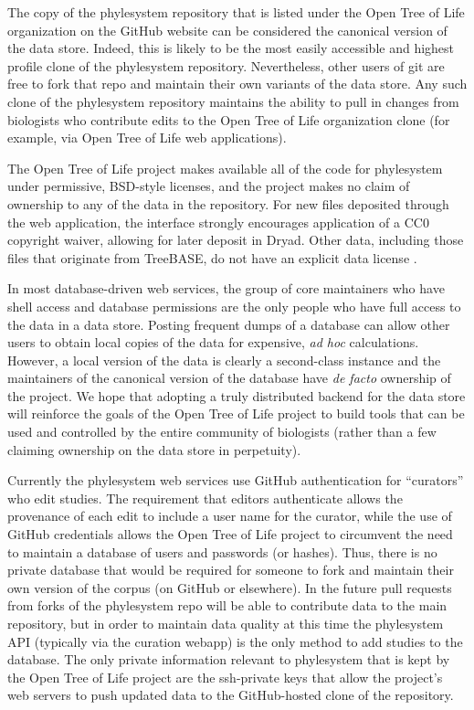 \documentclass{bioinfo}
\newcommand{\ps}{phylesystem\xspace}
\newcommand{\otol}{Open Tree of Life\xspace}
\begin{document}
The copy of the \ps repository that is listed under the \otol organization on
    the GitHub website %
    can be considered the canonical version of the data store.
Indeed, this is likely to be the most easily accessible and highest profile clone of the \ps repository.
Nevertheless, other users of git are free to fork that repo and maintain their own variants of the data store.
Any such clone of the \ps repository maintains the ability to pull in changes from biologists who contribute
    edits to the \otol organization clone (for example, via \otol web applications).

The \otol project makes available all of the code for \ps under permissive, BSD-style licenses, and the
    project makes no claim of ownership to any of the data in the repository. 
For new files deposited through the web application, the interface strongly encourages application of a CC0 copyright waiver, 
    allowing for later deposit in Dryad. Other data, including those files that originate from TreeBASE,
    do not have an explicit data license \citep[although we believe that copyright does not apply to any of the data; see][]{Patterson2014}.

In most database-driven web services, the group of core maintainers who have shell access and 
    database permissions are the only people who have full access to the data in a data store.
Posting frequent dumps of a database can allow other users to obtain local copies of the data 
    for expensive, {\em ad hoc} calculations.
However, a local version of the data is clearly a second-class instance and the maintainers of the 
    canonical version of the database have {\em de facto} ownership of the project.
We hope that adopting a truly distributed backend for the data store will reinforce the goals
    of the \otol project to build tools that can be used and controlled by the entire community of biologists 
    (rather than a few claiming ownership on the data store in perpetuity).

Currently the \ps web services use GitHub authentication for ``curators'' who edit studies.
The requirement that editors authenticate allows the provenance of each edit to include 
    a user name for the curator, while the use of GitHub credentials allows the \otol project
    to circumvent the need to maintain a database of users and passwords (or hashes).
Thus, there is no private database that would be required for someone to fork and maintain their
    own version of the corpus (on GitHub or elsewhere).
In the future pull requests from forks of the \ps repo will be able to contribute data to the main repository,
   but in order to maintain data quality at this time the \ps API (typically via the curation webapp) is the only method to add studies to the database.
The only private information relevant to \ps that is kept by the \otol project are the ssh-private
    keys that allow the project's web servers to push updated data to the GitHub-hosted clone of the 
    repository.
\end{document}

